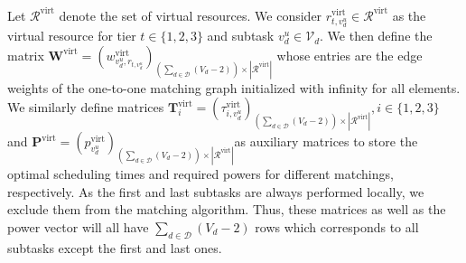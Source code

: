 \documentclass[12pt,draftclsnofoot,onecolumn]{IEEEtran}
\begin{document}
Let $\mathcal{R}^{\text{virt}}$ denote the set of virtual resources. We consider $r_{t,v_d^u}^{\text{virt}}\in\mathcal{R}^{\text{virt}}$ as the virtual resource for tier $t\in\{1,2,3\}$ and subtask $v_d^u\in\mathcal{V}_d$. We then define the matrix $\boldsymbol{W}^{\text{virt}} = \left(w_{v_d^u,r_{t,v_d^u}}^{\text{virt}}\right)_{\left(\sum_{d\in\mathcal{D}}{\left(V_d-2\right)}\right)\times|\mathcal{R}^{\text{virt}}|}$ whose entries are the edge weights of the one-to-one matching graph initialized with infinity for all elements. We similarly define matrices $\boldsymbol{T}_i^{\text{virt}} = \left(\tau_{i,v_d^u}^{\text{virt}}\right)_{\left(\sum_{d\in\mathcal{D}}{\left(V_d-2\right)}\right)\times|\mathcal{R}^{\text{virt}}|}, i\in\{1,2,3\}$ and $\boldsymbol{P}^{\text{virt}} = \left(p_{v_d^u}^{\text{virt}}\right)_{\left(\sum_{d\in\mathcal{D}}{\left(V_d-2\right)}\right)\times|\mathcal{R}^{\text{virt}}|}$as auxiliary matrices to store the optimal scheduling times and required powers for different matchings, respectively. As the first and last subtasks are always performed locally, we exclude them from the matching algorithm. Thus, these matrices as well as the power vector will all have $\sum_{d\in\mathcal{D}}{\left(V_d-2\right)}$ rows which corresponds to all subtasks except the first and last ones.
\end{document}
